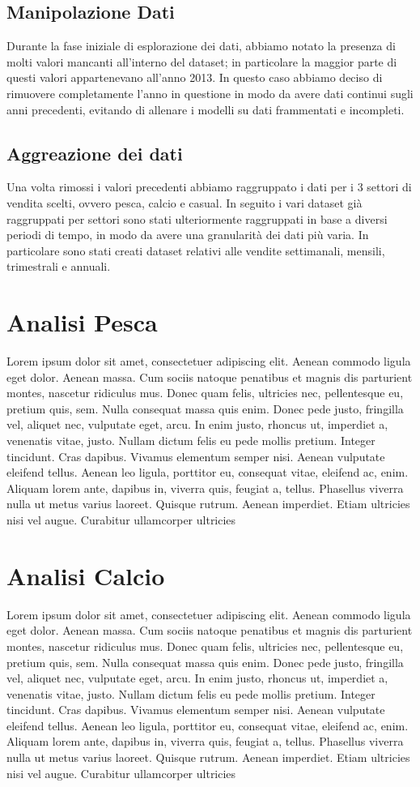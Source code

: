 \documentclass[12pt, a4paper, twocolumn]{article} %
\begin{document}
\subsection{Manipolazione Dati}
Durante la fase iniziale di esplorazione dei dati, abbiamo notato la presenza di molti valori mancanti all'interno del dataset; in particolare la maggior parte di questi valori appartenevano all'anno 2013. In questo caso abbiamo deciso di rimuovere completamente l'anno in questione in modo da avere dati continui sugli anni precedenti, evitando di allenare i modelli su dati frammentati e incompleti.
\subsection{Aggreazione dei dati}
Una volta rimossi i valori precedenti abbiamo raggruppato i dati per i 3 settori di vendita scelti, ovvero pesca, calcio e casual. In seguito i vari dataset già raggruppati per settori sono stati ulteriormente raggruppati in base a diversi periodi di tempo, in modo da avere una granularità dei dati più varia. In particolare sono stati creati dataset relativi alle vendite settimanali, mensili, trimestrali e annuali.

\section{Analisi Pesca}
Lorem ipsum dolor sit amet, consectetuer adipiscing elit. Aenean commodo ligula eget dolor. Aenean massa. Cum sociis natoque penatibus et magnis dis parturient montes, nascetur ridiculus mus. Donec quam felis, ultricies nec, pellentesque eu, pretium quis, sem. Nulla consequat massa quis enim. Donec pede justo, fringilla vel, aliquet nec, vulputate eget, arcu. In enim justo, rhoncus ut, imperdiet a, venenatis vitae, justo. Nullam dictum felis eu pede mollis pretium. Integer tincidunt. Cras dapibus. Vivamus elementum semper nisi. Aenean vulputate eleifend tellus. Aenean leo ligula, porttitor eu, consequat vitae, eleifend ac, enim. Aliquam lorem ante, dapibus in, viverra quis, feugiat a, tellus. Phasellus viverra nulla ut metus varius laoreet. Quisque rutrum. Aenean imperdiet. Etiam ultricies nisi vel augue. Curabitur ullamcorper ultricies

\section{Analisi Calcio}
Lorem ipsum dolor sit amet, consectetuer adipiscing elit. Aenean commodo ligula eget dolor. Aenean massa. Cum sociis natoque penatibus et magnis dis parturient montes, nascetur ridiculus mus. Donec quam felis, ultricies nec, pellentesque eu, pretium quis, sem. Nulla consequat massa quis enim. Donec pede justo, fringilla vel, aliquet nec, vulputate eget, arcu. In enim justo, rhoncus ut, imperdiet a, venenatis vitae, justo. Nullam dictum felis eu pede mollis pretium. Integer tincidunt. Cras dapibus. Vivamus elementum semper nisi. Aenean vulputate eleifend tellus. Aenean leo ligula, porttitor eu, consequat vitae, eleifend ac, enim. Aliquam lorem ante, dapibus in, viverra quis, feugiat a, tellus. Phasellus viverra nulla ut metus varius laoreet. Quisque rutrum. Aenean imperdiet. Etiam ultricies nisi vel augue. Curabitur ullamcorper ultricies
\end{document}
